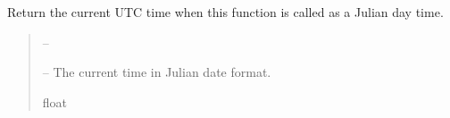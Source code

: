 \documentclass[letterpaper,11pt,english]{sphinxmanual}
\begin{document}
\begin{savenotes}\begin{fulllineitems}
\label{\detokenize{code/opihiexarata.library.conversion:opihiexarata.library.conversion.current_utc_to_julian_day}}
\pysigstartsignatures
{}
\pysigstopsignatures
\sphinxAtStartPar
Return the current UTC time when this function is called as a Julian day
time.
\begin{quote}\begin{description}
\sphinxAtStartPar
{} – 

\sphinxAtStartPar
{} – The current time in Julian date format.

\sphinxAtStartPar
float

\end{description}\end{quote}

\end{fulllineitems}\end{savenotes}

\end{document}
